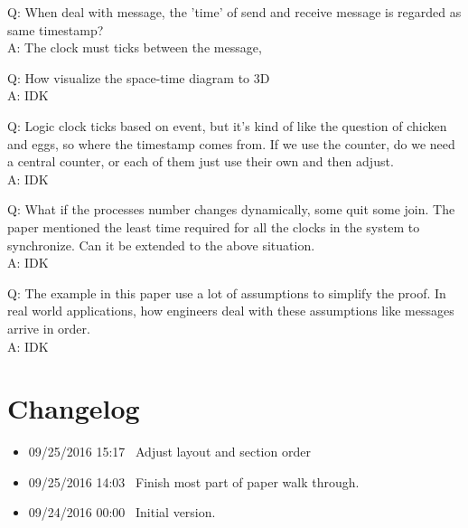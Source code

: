 \documentclass[12pt,a4paper,oneside]{article}
\begin{document}
Q: When deal with message, the 'time' of send and receive message is regarded as same timestamp? \\
A: The clock must ticks between the message,  %

\medskip

Q: How visualize the space-time diagram to 3D \\
A: IDK

\medskip

Q: Logic clock ticks based on event, but it's kind of like the question of chicken and eggs, so where the timestamp comes from.
If we use the counter, do we need a central counter, or each of them just use their own and then adjust. \\
A: IDK

\medskip

Q: What if the processes number changes dynamically, some quit some join. The paper mentioned the least time required for all the
clocks in the system to synchronize. Can it be extended to the above situation. \\
A: IDK

\medskip

Q: The example in this paper use a lot of assumptions to simplify the proof.
In real world applications, how engineers deal with these assumptions like messages
arrive in order. \\
A: IDK

\section{Changelog}

\begin{itemize}
  \item 09/25/2016 15:17 \ Adjust layout and section order
  \item 09/25/2016 14:03 \ Finish most part of paper walk through.
  \item 09/24/2016 00:00 \ Initial version.
\end{itemize}

\printbibliography
\end{document}
